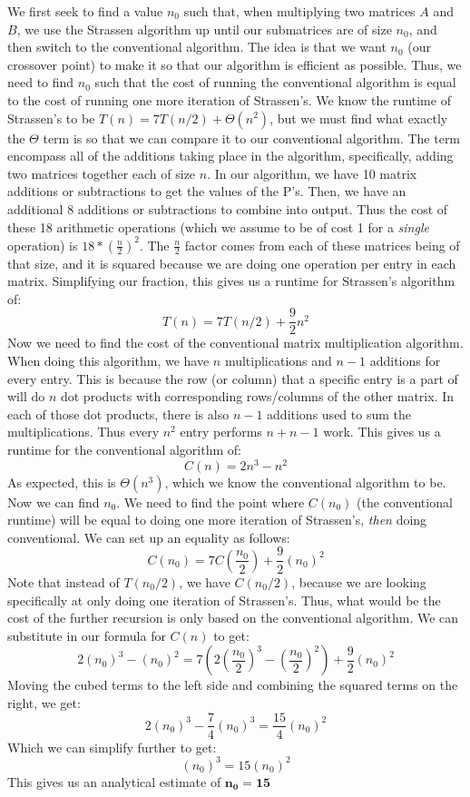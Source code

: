 \documentclass[11pt]{article}
\begin{document}
We first seek to find a value $n_0$ such that, when multiplying two matrices $A$ and $B$, we use the Strassen algorithm up until our submatrices are of size $n_0$, and then switch to the conventional algorithm. The idea is that we want $n_0$ (our crossover point) to make it so that our algorithm is efficient as possible. Thus, we need to find $n_0$ such that the cost of running the conventional algorithm is equal to the cost of running one more iteration of Strassen's.
\newline
We know the runtime of Strassen's to be $T(n) = 7T(n/2) + \Theta(n^2)$, but we must find what exactly the $\Theta$ term is so that we can compare it to our conventional algorithm. The term encompass all of the additions taking place in the algorithm, specifically, adding two matrices together each of size $n$. In our algorithm, we have 10 matrix additions or subtractions to get the values of the P's. Then, we have an additional 8 additions or subtractions to combine into output. Thus the cost of these 18 arithmetic operations (which we assume to be of cost 1 for a \textit{single} operation) is $18*(\frac{n}{2})^2$. The $\frac{n}{2}$ factor comes from each of these matrices being of that size, and it is squared because we are doing one operation per entry in each matrix. Simplifying our fraction, this gives us a runtime for Strassen's algorithm of:
$$T(n) = 7T(n/2) + \frac{9}{2}n^2$$
\newline
Now we need to find the cost of the conventional matrix multiplication algorithm. When doing this algorithm, we have $n$ multiplications and $n-1$ additions for every entry. This is because the row (or column) that a specific entry is a part of will do $n$ dot products with corresponding rows/columns of the other matrix. In each of those dot products, there is also $n-1$ additions used to sum the multiplications. Thus every $n^2$ entry performs $n + n-1$ work. This gives us a runtime for the conventional algorithm of:
$$C(n) = 2n^3 - n^2$$
As expected, this is $\Theta(n^3)$, which we know the conventional algorithm to be. 
\newline
Now we can find $n_0$. We need to find the point where $C(n_0)$ (the conventional runtime) will be equal to doing one more iteration of Strassen's, \textit{then} doing conventional. We can set up an equality as follows:
$$C(n_0) =  7C(\frac{n_0}{2}) + \frac{9}{2}(n_0)^2$$
Note that instead of $T(n_0/2)$, we have $C(n_0/2)$, because we are looking specifically at only doing one iteration of Strassen's. Thus, what would be the cost of the further recursion is only based on the conventional algorithm. We can substitute in our formula for $C(n)$ to get:
$$2(n_0)^3 - (n_0)^2 = 7(2(\frac{n_0}{2})^3 - (\frac{n_0}{2})^2) + \frac{9}{2}(n_0)^2 $$
Moving the cubed terms to the left side and combining the squared terms on the right, we get:
$$2(n_0)^3-\frac{7}{4}(n_0)^3 = \frac{15}{4}(n_0)^2$$
Which we can simplify further to get:
$$(n_0)^3 = 15(n_0)^2$$
This gives us an analytical estimate of $\bm{n_0 = 15}$
\end{document}
